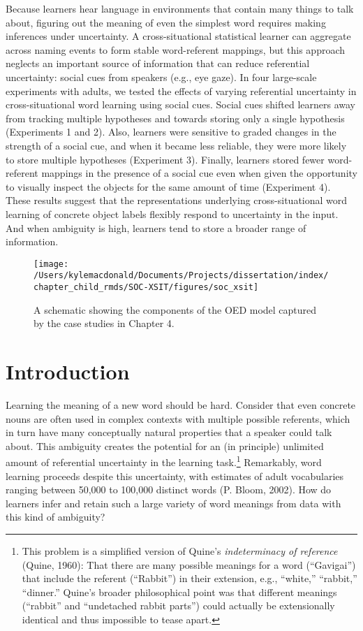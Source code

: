 \documentclass[oneside]{report}
\begin{document}
Because learners hear language in environments that contain many things
to talk about, figuring out the meaning of even the simplest word
requires making inferences under uncertainty. A cross-situational
statistical learner can aggregate across naming events to form stable
word-referent mappings, but this approach neglects an important source
of information that can reduce referential uncertainty: social cues from
speakers (e.g., eye gaze). In four large-scale experiments with adults,
we tested the effects of varying referential uncertainty in
cross-situational word learning using social cues. Social cues shifted
learners away from tracking multiple hypotheses and towards storing only
a single hypothesis (Experiments 1 and 2). Also, learners were sensitive
to graded changes in the strength of a social cue, and when it became
less reliable, they were more likely to store multiple hypotheses
(Experiment 3). Finally, learners stored fewer word-referent mappings in
the presence of a social cue even when given the opportunity to visually
inspect the objects for the same amount of time (Experiment 4). These
results suggest that the representations underlying cross-situational
word learning of concrete object labels flexibly respond to uncertainty
in the input. And when ambiguity is high, learners tend to store a
broader range of information.
\begin{figure}[t]

{\centering \texttt{[image: /Users/kylemacdonald/Documents/Projects/dissertation/index/chapter\_child\_rmds/SOC-XSIT/figures/soc\_xsit]} 

}

\caption[Overview of Chapter 4.]{A schematic showing the components of the OED model captured by the case studies in Chapter 4.}\label{fig:schematic-soc-xsit}
\end{figure}
\section{Introduction}\label{introduction-3}

Learning the meaning of a new word should be hard. Consider that even
concrete nouns are often used in complex contexts with multiple possible
referents, which in turn have many conceptually natural properties that
a speaker could talk about. This ambiguity creates the potential for an
(in principle) unlimited amount of referential uncertainty in the
learning task.\footnote{This problem is a simplified version of Quine's
  \textit{indeterminacy of reference} (Quine, 1960): That there are many
  possible meanings for a word (``Gavigai'') that include the referent
  (``Rabbit'') in their extension, e.g., ``white,'' ``rabbit,''
  ``dinner.'' Quine's broader philosophical point was that different
  meanings (``rabbit'' and ``undetached rabbit parts'') could actually
  be extensionally identical and thus impossible to tease apart.}
Remarkably, word learning proceeds despite this uncertainty, with
estimates of adult vocabularies ranging between 50,000 to 100,000
distinct words (P. Bloom, 2002). How do learners infer and retain such a
large variety of word meanings from data with this kind of ambiguity?
\end{document}
